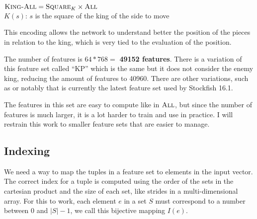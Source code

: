 \begin{center}
    $\textsc{King-All} = \textsc{Square}_{K} \times \textsc{All}$ \\
    $K(s)$: $s$ is the square of the king of the side to move\\
\end{center}

This encoding allows the network to understand better the position of the pieces in relation to the king, which is very tied to the evaluation of the position.

The number of features is $64*768=$ \textbf{49152 features}. There is a variation of this feature set called \enquote{KP} which is the same but it does not consider the enemy king, reducing the amount of features to 40960. There are other variations, such as  or notably  that is currently the latest feature set used by Stockfish 16.1.

The features in this set are easy to compute like in $\textsc{All}$, but since the number of features is much larger, it is a lot harder to train and use in practice. I will restrain this work to smaller feature sets that are easier to manage.

\newpage
\subsection{Indexing}


We need a way to map the tuples in a feature set to elements in the input vector. The correct index for a tuple is computed using the order of the sets in the cartesian product and the size of each set, like strides in a multi-dimensional array. For this to work, each element $e$ in a set $S$ must correspond to a number between $0$ and $|S| - 1$, we call this bijective mapping $I(e)$.

